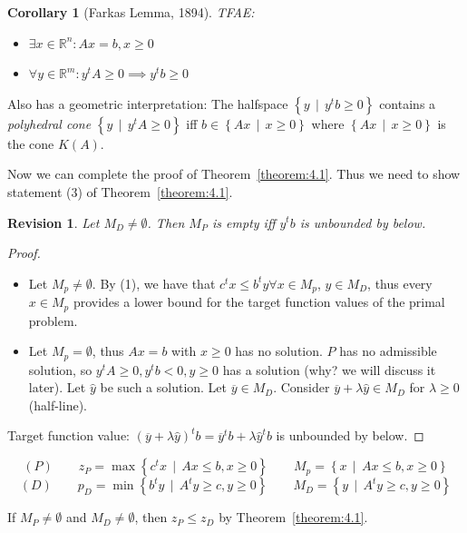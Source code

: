 \documentclass[a4paper]{article}
\newcounter{lecref}[subsection]
\numberwithin{lecref}{subsection}
\newtheorem{corollary}[lecref]{Corollary}
\newtheorem{revision}{Revision}
\newcommand{\SetDef}[2]{\left\{#1\,\mid\,#2\right\}}
\begin{document}
\begin{corollary}[Farkas Lemma, 1894]
	\label{corollary:4.4}
	TFAE:
	\begin{itemize}
		\item $\exists x \in \mathbb R^n: Ax = b, x \geq 0$
		\item $\forall y \in \mathbb R^m: y^t A \geq 0 \implies y^t b \geq 0$
	\end{itemize}
\end{corollary}

Also has a geometric interpretation:
The halfspace $\SetDef{y}{y^t b \geq 0}$ contains a \emph{polyhedral cone} $\SetDef{y}{y^t A \geq 0}$
iff $b \in \SetDef{Ax}{x \geq 0}$ where $\SetDef{Ax}{x \geq 0}$ is the cone $K(A)$.

Now we can complete the proof of Theorem~\ref{theorem:4.1}.
Thus we need to show statement (3) of Theorem~\ref{theorem:4.1}.

\begin{revision}
	Let $M_D \neq \emptyset$. Then $M_P$ is empty iff $y^t b$ is unbounded by below.
\end{revision}

\begin{proof}
	\begin{itemize}
		\item
			Let $M_p \neq \emptyset$. By (1), we have that $c^t x \leq b^t y \forall x \in M_p$, $y \in M_D$,
			thus every $x \in M_p$ provides a lower bound for the target function values of the primal problem.
		\item
			Let $M_p = \emptyset$, thus $Ax = b$ with $x \geq 0$ has no solution.
			$P$ has no admissible solution, so $y^t A \geq 0, y^t b < 0, y \geq 0$ has a solution (why? we will discuss it later).
			Let $\hat y$ be such a solution. Let $\overline y \in M_D$. Consider $\overline y + \lambda \hat y \in M_D$ for $\lambda \geq 0$ (half-line).
	\end{itemize}

	Target function value: $(\overline y + \lambda \hat y)^t b = \overline y^t b + \lambda \hat y^t b$ is unbounded by below.
\end{proof}

\[ (P) \qquad z_P = \max\SetDef{c^t x}{Ax \leq b, x \geq 0} \qquad M_p = \SetDef{x}{Ax \leq b, x \geq 0}  \]
\[ (D) \qquad p_D = \min\SetDef{b^t y}{A^t y \geq c, y \geq 0} \qquad M_D = \SetDef{y}{A^t y \geq c, y \geq 0} \]

If $M_P \neq \emptyset$ and $M_D \neq \emptyset$, then $z_P \leq z_D$ by Theorem~\ref{theorem:4.1}.
\end{document}
